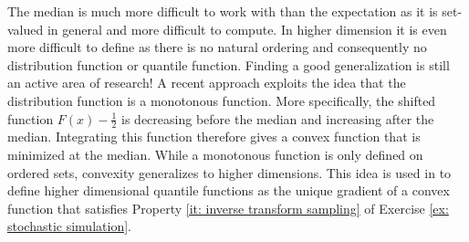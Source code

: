 \begin{remark}
    The median is much more difficult to work with than the expectation
    as it is set-valued in general and more difficult to compute.
    In higher dimension it is even more difficult to define as there is no
    natural ordering and consequently no distribution function or quantile
    function. Finding a good generalization is still an active area of
    research! A recent approach \citep{hallinDistributionQuantileFunctions2021}
    exploits the idea that the distribution function is a monotonous function.
    More specifically, the shifted function \(F(x) - \frac12\) is decreasing
    before the median and increasing after the median. Integrating this function
    therefore gives a convex function that is minimized at the median.
    While a monotonous function is only defined on ordered sets, convexity
    generalizes to higher dimensions. This idea is used in
    \citep{hallinDistributionQuantileFunctions2021} to define higher dimensional
    quantile functions as the unique gradient of a convex function
    that satisfies Property \ref{it: inverse transform sampling} of Exercise \ref{ex:
    stochastic simulation}.
\end{remark}